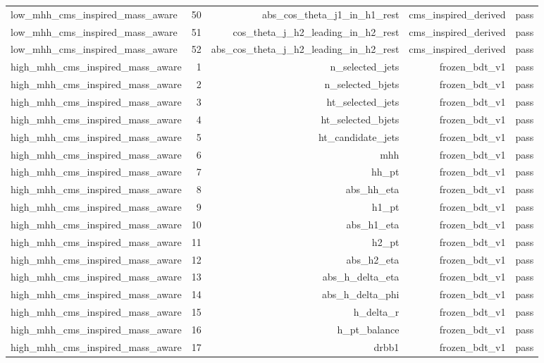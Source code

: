 \begin{table}[htbp]
\begin{tabular}{lrrrr}
low\_mhh\_cms\_inspired\_mass\_aware & 50 & abs\_cos\_theta\_j1\_in\_h1\_rest & cms\_inspired\_derived & pass \\
low\_mhh\_cms\_inspired\_mass\_aware & 51 & cos\_theta\_j\_h2\_leading\_in\_h2\_rest & cms\_inspired\_derived & pass \\
low\_mhh\_cms\_inspired\_mass\_aware & 52 & abs\_cos\_theta\_j\_h2\_leading\_in\_h2\_rest & cms\_inspired\_derived & pass \\
high\_mhh\_cms\_inspired\_mass\_aware & 1 & n\_selected\_jets & frozen\_bdt\_v1 & pass \\
high\_mhh\_cms\_inspired\_mass\_aware & 2 & n\_selected\_bjets & frozen\_bdt\_v1 & pass \\
high\_mhh\_cms\_inspired\_mass\_aware & 3 & ht\_selected\_jets & frozen\_bdt\_v1 & pass \\
high\_mhh\_cms\_inspired\_mass\_aware & 4 & ht\_selected\_bjets & frozen\_bdt\_v1 & pass \\
high\_mhh\_cms\_inspired\_mass\_aware & 5 & ht\_candidate\_jets & frozen\_bdt\_v1 & pass \\
high\_mhh\_cms\_inspired\_mass\_aware & 6 & mhh & frozen\_bdt\_v1 & pass \\
high\_mhh\_cms\_inspired\_mass\_aware & 7 & hh\_pt & frozen\_bdt\_v1 & pass \\
high\_mhh\_cms\_inspired\_mass\_aware & 8 & abs\_hh\_eta & frozen\_bdt\_v1 & pass \\
high\_mhh\_cms\_inspired\_mass\_aware & 9 & h1\_pt & frozen\_bdt\_v1 & pass \\
high\_mhh\_cms\_inspired\_mass\_aware & 10 & abs\_h1\_eta & frozen\_bdt\_v1 & pass \\
high\_mhh\_cms\_inspired\_mass\_aware & 11 & h2\_pt & frozen\_bdt\_v1 & pass \\
high\_mhh\_cms\_inspired\_mass\_aware & 12 & abs\_h2\_eta & frozen\_bdt\_v1 & pass \\
high\_mhh\_cms\_inspired\_mass\_aware & 13 & abs\_h\_delta\_eta & frozen\_bdt\_v1 & pass \\
high\_mhh\_cms\_inspired\_mass\_aware & 14 & abs\_h\_delta\_phi & frozen\_bdt\_v1 & pass \\
high\_mhh\_cms\_inspired\_mass\_aware & 15 & h\_delta\_r & frozen\_bdt\_v1 & pass \\
high\_mhh\_cms\_inspired\_mass\_aware & 16 & h\_pt\_balance & frozen\_bdt\_v1 & pass \\
high\_mhh\_cms\_inspired\_mass\_aware & 17 & drbb1 & frozen\_bdt\_v1 & pass \\

\end{tabular}
\end{table}
